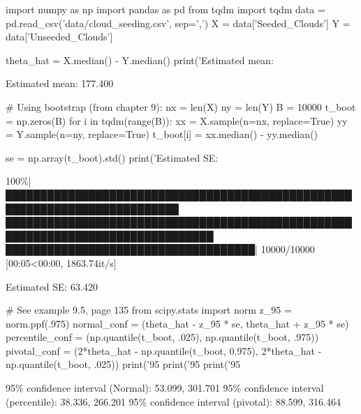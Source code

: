 \begin{python}
import numpy as np
import pandas as pd
from tqdm import tqdm
data = pd.read_csv('data/cloud_seeding.csv', sep=',')
X = data['Seeded_Clouds']
Y = data['Unseeded_Clouds']
\end{python}

\begin{python}
theta_hat = X.median() - Y.median()
print('Estimated mean: %
\end{python}
\begin{console}
Estimated mean: 177.400
\end{console}

\begin{python}
# Using bootstrap (from chapter 9):
nx = len(X)
ny = len(Y)
B = 10000
t_boot = np.zeros(B)
for i in tqdm(range(B)):
    xx = X.sample(n=nx, replace=True)
    yy = Y.sample(n=ny, replace=True)
    t_boot[i] = xx.median() - yy.median()
    
se = np.array(t_boot).std()
print('Estimated SE: %
\end{python}
\begin{console}
100\%|███████████████████████████████████████████████████████████████████████████
████████████████████████████████████████████████████████████████████████████████
████████████████████████████████████| 10000/10000 [00:05<00:00, 1863.74it/s]
\end{console}
\begin{console}
Estimated SE: 63.420
\end{console}

\begin{python}
# See example 9.5, page 135
from scipy.stats import norm
z_95 = norm.ppf(.975)
normal_conf = (theta_hat - z_95 * se, theta_hat + z_95 * se)
percentile_conf = (np.quantile(t_boot, .025), np.quantile(t_boot, .975))
pivotal_conf = (2*theta_hat - np.quantile(t_boot, 0.975), 
                2*theta_hat - np.quantile(t_boot, .025))
print('95%
print('95%
print('95%
\end{python}
\begin{console}
95\% confidence interval (Normal):        53.099, 301.701
95\% confidence interval (percentile):    38.336, 266.201
95\% confidence interval (pivotal):       88.599, 316.464
\end{console}
